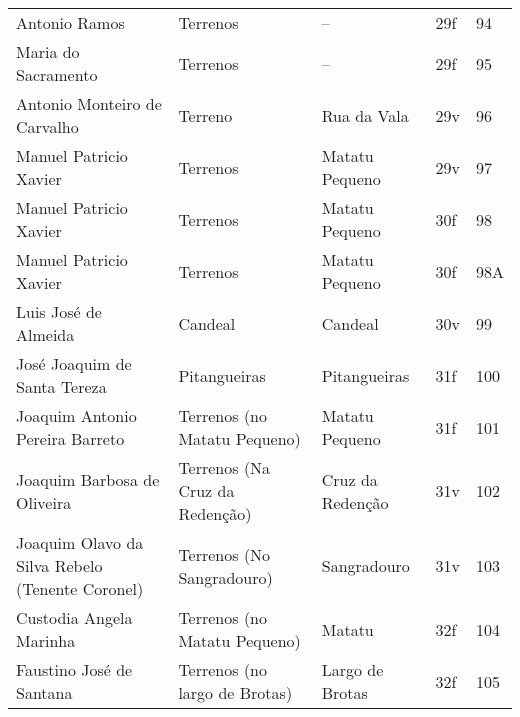 \begin{table}
{\begin{minipage}{\textwidth}
\begin{tiny}
\begin{tabular}{p{4cm}p{4cm}p{4cm}ll}
Antonio Ramos									&Terrenos				&--					&29f			&94			\\
Maria do Sacramento								&Terrenos				&--					&29f			&95			\\
Antonio Monteiro de Carvalho							&Terreno				&Rua da Vala					&29v			&96			\\
Manuel Patricio Xavier								&Terrenos				&Matatu Pequeno				&29v			&97			\\
Manuel Patricio Xavier								&Terrenos				&Matatu Pequeno				&30f			&98			\\
Manuel Patricio Xavier								&Terrenos				&Matatu Pequeno				&30f			&98A			\\
Luis José de Almeida								&Candeal				&Candeal				&30v			&99			\\
José Joaquim de Santa Tereza							&Pitangueiras				&Pitangueiras				&31f			&100			\\
Joaquim Antonio Pereira Barreto							&Terrenos (no Matatu Pequeno)		&Matatu Pequeno				&31f			&101			\\
Joaquim Barbosa de Oliveira							&Terrenos (Na Cruz da Redenção)		&Cruz da Redenção			&31v			&102			\\
Joaquim Olavo da Silva Rebelo (Tenente Coronel)					&Terrenos (No Sangradouro)		&Sangradouro				&31v			&103			\\
Custodia Angela Marinha								&Terrenos (no Matatu Pequeno)		&Matatu					&32f			&104			\\
Faustino José de Santana							&Terrenos (no largo de Brotas)		&Largo de Brotas			&32f			&105			\\
\bottomrule
\end{tabular} 
\end{tiny}
\end{minipage}
}
{}
\end{table}

